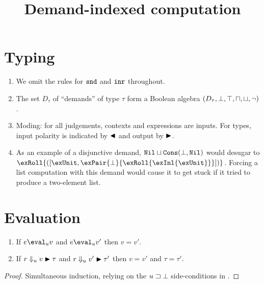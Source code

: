 \documentclass[usenames,dvipsnames,preprint]{sigplanconf}
\begin{document}
\title{Demand-indexed computation}

\authorinfo{}{}{}{}

\maketitle









\section{Typing}

\begin{enumerate}
\item We omit the rules for ${\text{\tt{snd}}}$ and ${\text{\tt{inr}}}$ throughout.
\item The set $D_{\tau}$ of ``demands'' of type $\tau$ form a Boolean
  algebra $(D_{\tau},\bot,\top,\sqcap,\sqcup,\neg)$.
\item Moding: for all judgements, contexts and expressions are
  inputs. For types, input polarity is indicated by $\blacktriangleleft$ and
  output by $\blacktriangleright$.
\item As an example of a disjunctive demand, $\texttt{Nil} \sqcup
  \texttt{Cons}(\bot,\texttt{Nil})$ would desugar to
  $\exRoll{(\exInlr{\exUnit}{\exPair{\bot}{\exRoll{\exInl{\exUnit}}}})}$. Forcing
  a list computation with this demand would cause it to get stuck if
  it tried to produce a two-element list.
\end{enumerate}

\section{Evaluation}

\begin{lemma}[Determinism]
\label{lem:eval:deterministic}
\item
\begin{enumerate}
\item If $e \eval_{u} v$ and $e \eval_{u} v'$ then $v = v'$.
\item If $r \Downarrow_{u} v \blacktriangleright \tau$ and $r \Downarrow_{u} v' \blacktriangleright
  \tau'$ then $v = v'$ and $\tau = \tau'$.
\end{enumerate}
\end{lemma}
\begin{proof}
  Simultaneous induction, relying on the $u \sqsupset \bot$
  side-conditions in .
\end{proof}
\end{document}
